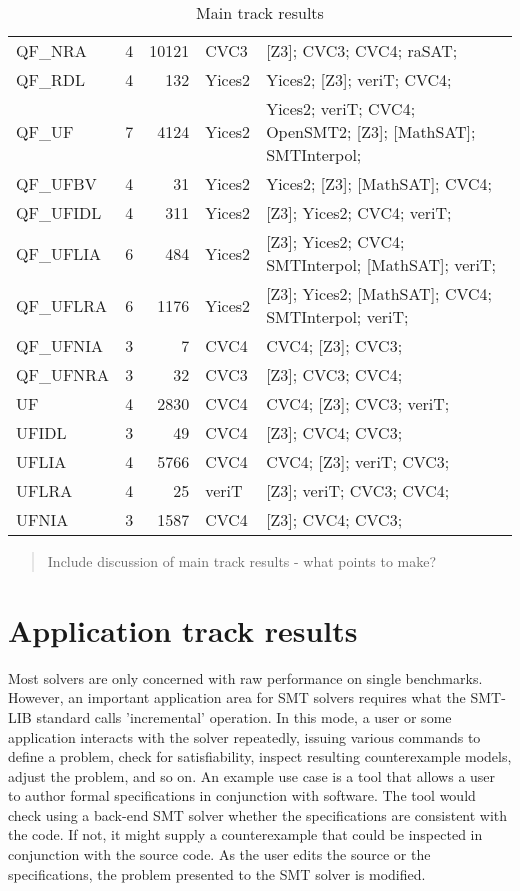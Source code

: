 \documentclass[twosize,11pt]{article}
\newcommand{\comment}[2]{\begin{quote}\sc #1\marginpar{\textcolor{red}{$\ast^{\mbox{#2}}$}}\end{quote}}
\newcommand{\davidc}[1]{\comment{#1}{DC}}
\begin{document}
\begin{table}
\begin{tabular}{|l|r|r|l|l|}
QF\_NRA & 	4 & 	10121 & CVC3 & 	[Z3]; CVC3; CVC4; raSAT; \\
QF\_RDL & 	4 & 	132 & 	Yices2 & 	Yices2; [Z3]; veriT; CVC4; \\
QF\_UF & 	7 & 	4124 & 	Yices2 & 	Yices2; veriT; CVC4; OpenSMT2; [Z3]; [MathSAT]; SMTInterpol; \\
QF\_UFBV & 	4 & 	31 & 	Yices2 & 	Yices2; [Z3]; [MathSAT]; CVC4; \\
QF\_UFIDL & 	4 & 	311 & 	Yices2 & 	[Z3]; Yices2; CVC4; veriT; \\
QF\_UFLIA & 	6 & 	484 & 	Yices2 & 	[Z3]; Yices2; CVC4; SMTInterpol; [MathSAT]; veriT; \\
QF\_UFLRA & 	6 & 	1176 & 	Yices2 & 	[Z3]; Yices2; [MathSAT]; CVC4; SMTInterpol; veriT; \\
QF\_UFNIA & 	3 & 	7 & 	CVC4 & 	CVC4; [Z3]; CVC3; \\
QF\_UFNRA & 	3 & 	32 & 	CVC3 & 	[Z3]; CVC3; CVC4; \\
UF & 		4 & 	2830 & 	CVC4 & 	CVC4; [Z3]; CVC3; veriT; \\
UFIDL & 	3 & 	49 & 	CVC4 & 	[Z3]; CVC4; CVC3; \\
UFLIA & 	4 & 	5766 & 	CVC4 & 	CVC4; [Z3]; veriT; CVC3; \\
UFLRA & 	4 & 	25 & 	veriT & 	[Z3]; veriT; CVC3; CVC4; \\
UFNIA & 	3 & 	1587 & 	CVC4 & 	[Z3]; CVC4; CVC3; \\
\hline
\end{tabular}
\vspace{.2in}
\caption{Main track results}
\label{Table:maintrack}
\end{table}



\davidc{Include discussion of main track results - what points to make?}


\section{Application track results}
\label{sec:application-results}

Most solvers are only concerned with raw performance on single benchmarks. However, an important application area for SMT solvers requires what the SMT-LIB standard calls 'incremental' operation.
In this mode, a user or some application interacts with the solver repeatedly, issuing various commands to define a problem, check for satisfiability, inspect resulting counterexample models, adjust the problem, and so on. An example use case is a tool that allows a user to author formal specifications in conjunction with software. The tool would
check using a back-end SMT solver whether the specifications are consistent with the code. If not, it might
supply a counterexample that could be inspected in conjunction with the source code. As the user edits the source or the specifications, the problem presented to the SMT solver is modified. 
\end{document}
